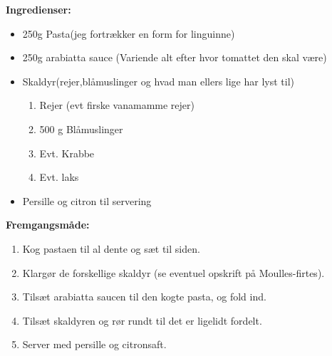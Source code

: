 \documentclass{book}
\begin{document}
\begin{minipage}[t]{0.5\textwidth}
\textbf{Ingredienser:}
\begin{itemize}
    \item 250g Pasta(jeg fortrækker en form for linguinne)
    \item 250g arabiatta sauce (Variende alt efter hvor tomattet den skal være)
    \item Skaldyr(rejer,blåmuslinger og hvad man ellers lige har lyst til)
    \begin{enumerate}
        \item Rejer (evt firske vanamamme rejer)
        \item 500 g Blåmuslinger
        \item Evt. Krabbe
        \item Evt. laks
    \end{enumerate}
    \item Persille og citron til servering
\end{itemize}
\end{minipage}
\begin{minipage}[t]{0.5\textwidth}
\textbf{Fremgangsmåde:}
\begin{enumerate}
    \item Kog pastaen til al dente og sæt til siden.
    \item Klargør de forskellige skaldyr (se eventuel opskrift på Moulles-firtes).
    \item Tilsæt arabiatta saucen til den kogte pasta, og fold ind.
    \item Tilsæt skaldyren og rør rundt til det er ligelidt fordelt.
    \item Server med persille og citronsaft.
\end{enumerate}
\end{minipage}
\newpage
\end{document}
